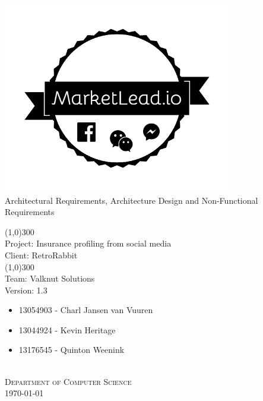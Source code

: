 \documentclass{article}
\begin{document}
	\begin{titlepage}
		\begin{center}
			\includegraphics[width=10cm]{images/marketlead_3.png}  \\
			[0.5cm]
			\huge{
			Architectural Requirements, Architecture Design and Non-Functional Requirements\\
			}

			\line(1,0){300}\\
			[0.2cm]
			\LARGE{Project: Insurance profiling from social media\\
			Client: RetroRabbit} \\
			\line(1,0){300}\\
			\LARGE{Team: Valknut Solutions}\\
			[1.0cm]
			\large{Version: 1.3}\\
			\large
			{
			\begin{itemize}
				\item 13054903 - Charl Jansen van Vuuren
				\item 13044924 - Kevin Heritage
				\item 13176545 - Quinton Weenink\\
			\end{itemize}
			}
			\textsc{\large}\\
		[1.0cm]
		\textsc{\large  Department of Computer Science}\\
		[0.5cm]
		\textsc{\large \today}\\
		\end{center}


	\end{titlepage}
	\cleardoublepage
	\tableofcontents
	\cleardoublepage
\end{document}
